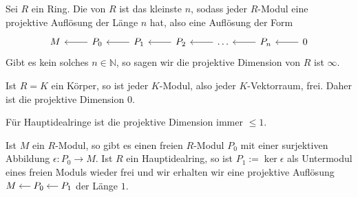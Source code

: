 \begin{definition}[{name=[projektive Dimension]}]
	Sei $R$ ein Ring.
	Die  von $R$ ist das kleinste $n$, sodass jeder $R$-Modul eine projektive Auflösung der Länge $n$ hat, also eine Auflösung der Form
	\[
		\begin{tikzcd}
			M & P_0 \lar & P_1 \lar & P_2 \lar & \ldots \lar & P_n \lar & 0 \lar
		\end{tikzcd}
	\] 
	Gibt es kein solches $n \in \mathbb{N}$, so sagen wir die projektive Dimension von $R$ ist $\infty$.
\end{definition}

\begin{beispiel}[{name=[Körper haben projektive Dimension $0$]}]
	Ist $R=K$ ein Körper, so ist jeder $K$-Modul, also jeder $K$-Vektorraum, frei.
	Daher ist die projektive Dimension $0$.
\end{beispiel}

\begin{satz}[{name=[projektive Dimension von Hauptidealringen]}]
	Für Hauptidealringe ist die projektive Dimension immer $\le 1$.
\end{satz}
\begin{beweis}
	Ist $M$ ein $R$-Modul, so gibt es einen freien $R$-Modul $P_0$ mit einer surjektiven Abbildung $\epsilon \colon P_0 \to M$.
	Ist $R$ ein Hauptidealring, so ist $P_1 := \ker \epsilon$ als Untermodul eines freien Moduls wieder frei und wir erhalten wir eine projektive Auflösung
	\(
		\begin{tikzcd}[cramped,sep=small]
			M & P_0 \lar & P_1 \lar
		\end{tikzcd}
	\)
	der Länge $1$.
\end{beweis}

